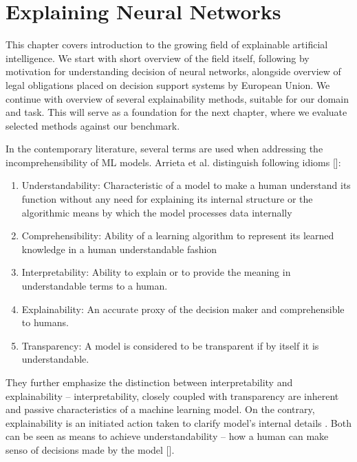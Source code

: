 \chapter{Explaining Neural Networks}


This chapter covers introduction to the growing field of explainable artificial intelligence. We start with short overview of the field itself, following by motivation for understanding decision of neural networks, alongside overview of legal obligations placed on decision support systems by European Union. We continue with overview of several explainability methods, suitable for our domain and task. This will serve as a foundation for the next chapter, where we evaluate selected methods against our benchmark.

In the contemporary literature, several terms are used when addressing the incomprehensibility of ML models. Arrieta et al. distinguish following idioms []:

\begin{enumerate}
    \item Understandability: Characteristic of a model to make a human understand its function without any need for explaining its internal structure or the algorithmic means by which the model processes data internally
    \item Comprehensibility: Ability of a learning algorithm to represent its learned knowledge in a human understandable fashion 
    \item Interpretability: Ability to explain or to provide the meaning in understandable terms to a human.
    \item Explainability: An accurate proxy of the decision maker and comprehensible to humans.
    \item Transparency: A model is considered to be transparent if by itself it is understandable.
\end{enumerate}

They further emphasize the distinction between interpretability and explainability -- interpretability, closely coupled with transparency are inherent and passive characteristics of a machine learning model. On the contrary, explainability is an initiated action taken to clarify model's internal details . Both can be seen as means to achieve understandability -- how a human can make senso of decisions made by the model [].

